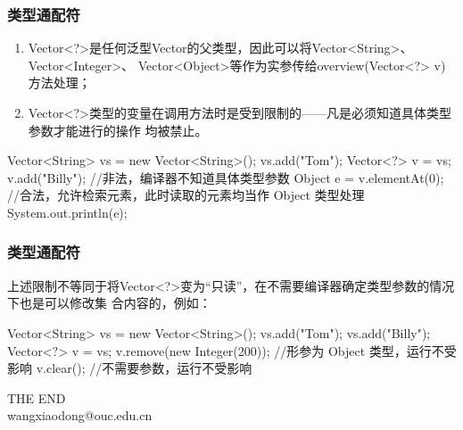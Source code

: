 \begin{frame}[fragile] %
\frametitle{类型通配符}

\begin{enumerate}
\item Vector<?>是任何泛型Vector的父类型，因此可以将Vector<String>、Vector<Integer>、
  Vector<Object>等作为实参传给overview(Vector<?> v)方法处理；
\item Vector<?>类型的变量在调用方法时是受到限制的——凡是必须知道具体类型参数才能进行的操作
  均被禁止。
\end{enumerate}

\begin{javaCode}
Vector<String> vs = new Vector<String>();
vs.add("Tom");
Vector<?> v = vs;
v.add("Billy");  //非法，编译器不知道具体类型参数
Object e = v.elementAt(0); //合法，允许检索元素，此时读取的元素均当作 Object 类型处理
System.out.println(e);
\end{javaCode}
\end{frame}

\begin{frame}[fragile] %
\frametitle{类型通配符}

上述限制不等同于将Vector<?>变为“只读”，在不需要编译器确定类型参数的情况下也是可以修改集
合内容的，例如：
\begin{javaCode}
Vector<String> vs = new Vector<String>();
vs.add("Tom");
vs.add("Billy");
Vector<?> v = vs;
v.remove(new Integer(200));  //形参为 Object 类型，运行不受影响
v.clear(); //不需要参数，运行不受影响
\end{javaCode}
\end{frame}




\begin{frame}[focus]
\centering
{\Huge {THE END}} \\
\vspace{5mm}
{\Large wangxiaodong@ouc.edu.cn} \\
\end{frame}
